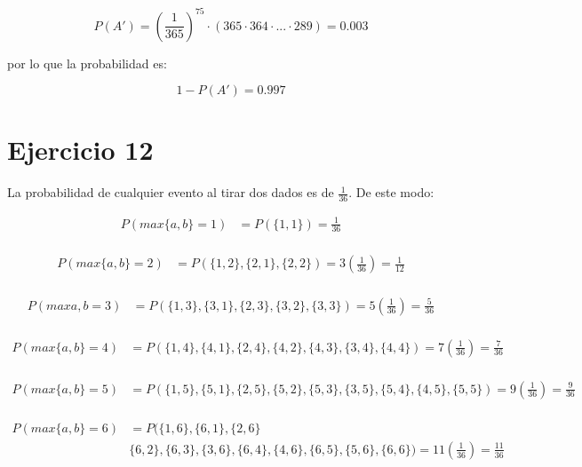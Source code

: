 \documentclass[letterpaper,12pt]{memoir}
\theoremstyle{definition}
\begin{document}
\begin{equation}
  P(A') = (\frac{1}{365})^{75} \cdot (365 \cdot 364 \cdot ... \cdot 289) = 0.003
\end{equation}

por lo que la probabilidad es:

\begin{equation}
  1 - P(A') = 0.997
\end{equation}

\section*{Ejercicio 12}

La probabilidad de cualquier evento al tirar dos dados es de \(\frac{1}{36}\). De este modo:

\begin{align*}
  P(max\{a,b\} = 1)  &= P(\{1,1\}) = \frac{1}{36}\\
\end{align*}

\begin{align*}
  P(max\{a,b\} = 2)  &= P(\{1,2\},\{2,1\},\{2,2\}) = 3(\frac{1}{36}) = \frac{1}{12}\\
\end{align*}

\begin{align*}
  P(max{a,b} = 3)  &= P(\{1,3\},\{3,1\},\{2,3\},\{3,2\},\{3,3\}) = 5(\frac{1}{36}) = \frac{5}{36}\\
\end{align*}

\begin{align*}
  P(max\{a,b\} = 4 ) &= P(\{1,4\},\{4,1\},\{2,4\},\{4,2\},\{4,3\},\{3,4\},\{4,4\}) = 7(\frac{1}{36}) = \frac{7}{36}\\
\end{align*}


\begin{align*}
  P(max\{a,b\} = 5)  &= P(\{1,5\},\{5,1\},\{2,5\},\{5,2\},\{5,3\},\{3,5\},\{5,4\},\{4,5\},\{5,5\}) = 9(\frac{1}{36}) = \frac{9}{36}\\
\end{align*}


\begin{align*}
  P(max\{a,b\} = 6)  &= P(\{1,6\},\{6,1\},\{2,6\}\\
                  & \{6,2\},\{6,3\},\{3,6\},\{6,4\},\{4,6\},\{6,5\},\{5,6\},\{6,6\}) = 11(\frac{1}{36}) = \frac{11}{36}
\end{align*}
\end{document}
